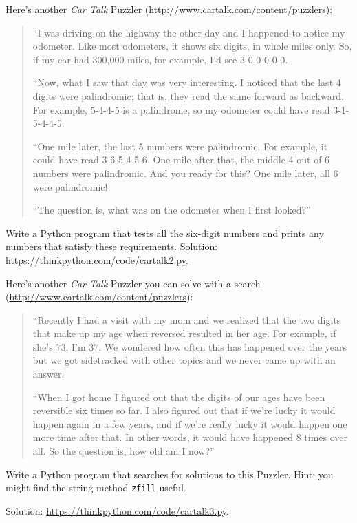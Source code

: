 \documentclass[10pt]{book}
\begin{document}
\begin{exercise}
Here's another {\em Car Talk}
Puzzler (\url{http://www.cartalk.com/content/puzzlers}):

\begin{quote}
``I was driving on the highway the other day and I happened to
notice my odometer. Like most odometers, it shows six digits,
in whole miles only. So, if my car had 300,000
miles, for example, I'd see 3-0-0-0-0-0.

``Now, what I saw that day was very interesting. I noticed that the
last 4 digits were palindromic; that is, they read the same forward as
backward. For example, 5-4-4-5 is a palindrome, so my odometer
could have read 3-1-5-4-4-5.

``One mile later, the last 5 numbers were palindromic. For example, it
could have read 3-6-5-4-5-6.  One mile after that, the middle 4 out of
6 numbers were palindromic.  And you ready for this? One mile later,
all 6 were palindromic!

``The question is, what was on the odometer when I first looked?''
\end{quote}

Write a Python program that tests all the six-digit numbers and prints
any numbers that satisfy these requirements.
Solution: \url{https://thinkpython.com/code/cartalk2.py}.

\end{exercise}


\begin{exercise}
Here's another {\em Car Talk} Puzzler you can solve with a
search (\url{http://www.cartalk.com/content/puzzlers}):

\begin{quote}
``Recently I had a visit with my mom and we realized that
the two digits that make up my age when reversed resulted in her
age. For example, if she's 73, I'm 37. We wondered how often this has
happened over the years but we got sidetracked with other topics and
we never came up with an answer.

``When I got home I figured out that the digits of our ages have been
reversible six times so far. I also figured out that if we're lucky it
would happen again in a few years, and if we're really lucky it would
happen one more time after that. In other words, it would have
happened 8 times over all. So the question is, how old am I now?''

\end{quote}

Write a Python program that searches for solutions to this Puzzler.
Hint: you might find the string method {\tt zfill} useful.

Solution: \url{https://thinkpython.com/code/cartalk3.py}.

\end{exercise}
\end{document}
